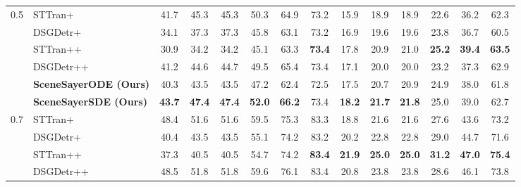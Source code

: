 \begin{table}[!h]
{\begin{tabular}{ll|cccccc|cccccc}
          \cmidrule(lr){2-7} \cmidrule(lr){8-13} 
        \multirow{6}{*}{0.5} &        STTran+ \cite{cong_et_al_sttran_2021} & 41.7 & 45.3 & 45.3 & 50.3 & 64.9 & 73.2 & 15.9 & 18.9 & 18.9 & 22.6 & 36.2 & 62.3  \\ 
        &        DSGDetr+ \cite{Feng_2021} & 34.1 & 37.3 & 37.3 & 45.8 & 63.1 & 73.2 & 16.9 & 19.6 & 19.6 & 23.8 & 36.7 & 60.5  \\ 
        &        STTran++ \cite{cong_et_al_sttran_2021} & 30.9 & 34.2 & 34.2 & 45.1 & 63.3 & \cellcolor{highlightColor} \textbf{73.4} & 17.8 & 20.9 & 21.0 & \cellcolor{highlightColor} \textbf{25.2} & \cellcolor{highlightColor} \textbf{39.4} & \cellcolor{highlightColor} \textbf{63.5}  \\ 
        &        DSGDetr++ \cite{Feng_2021} & 41.2 & 44.6 & 44.7 & 49.5 & 65.4 & 73.4 & 17.1 & 20.0 & 20.0 & 23.2 & 37.3 & 62.9  \\ 
        &        \textbf{SceneSayerODE (Ours)} & 40.3 & 43.5 & 43.5 & 47.2 & 62.4 & 72.5 & 17.5 & 20.7 & 20.9 & 24.9 & 38.0 & 61.8  \\ 
        &        \textbf{SceneSayerSDE (Ours)} & \cellcolor{highlightColor} \textbf{43.7} & \cellcolor{highlightColor} \textbf{47.4} & \cellcolor{highlightColor} \textbf{47.4} & \cellcolor{highlightColor} \textbf{52.0} & \cellcolor{highlightColor} \textbf{66.2} & 73.4 & \cellcolor{highlightColor} \textbf{18.2} & \cellcolor{highlightColor} \textbf{21.7} & \cellcolor{highlightColor} \textbf{21.8} & 25.0 & 39.0 & 62.7  \\ 
          \cmidrule(lr){2-7} \cmidrule(lr){8-13} 
        \multirow{6}{*}{0.7} &        STTran+ \cite{cong_et_al_sttran_2021} & 48.4 & 51.6 & 51.6 & 59.5 & 75.3 & 83.3 & 18.8 & 21.6 & 21.6 & 27.6 & 43.6 & 73.2  \\ 
        &        DSGDetr+ \cite{Feng_2021} & 40.4 & 43.5 & 43.5 & 55.1 & 74.2 & 83.2 & 20.2 & 22.8 & 22.8 & 29.0 & 44.7 & 71.6  \\ 
        &        STTran++ \cite{cong_et_al_sttran_2021} & 37.3 & 40.5 & 40.5 & 54.7 & 74.2 & \cellcolor{highlightColor} \textbf{83.4} & \cellcolor{highlightColor} \textbf{21.9} & \cellcolor{highlightColor} \textbf{25.0} & \cellcolor{highlightColor} \textbf{25.0} & \cellcolor{highlightColor} \textbf{31.2} & \cellcolor{highlightColor} \textbf{47.0} & \cellcolor{highlightColor} \textbf{75.4}  \\ 
        &        DSGDetr++ \cite{Feng_2021} & 48.5 & 51.8 & 51.8 & 59.6 & 76.1 & 83.4 & 20.8 & 23.8 & 23.8 & 28.6 & 46.1 & 73.8  \\ 

\end{tabular}}
\end{table}
